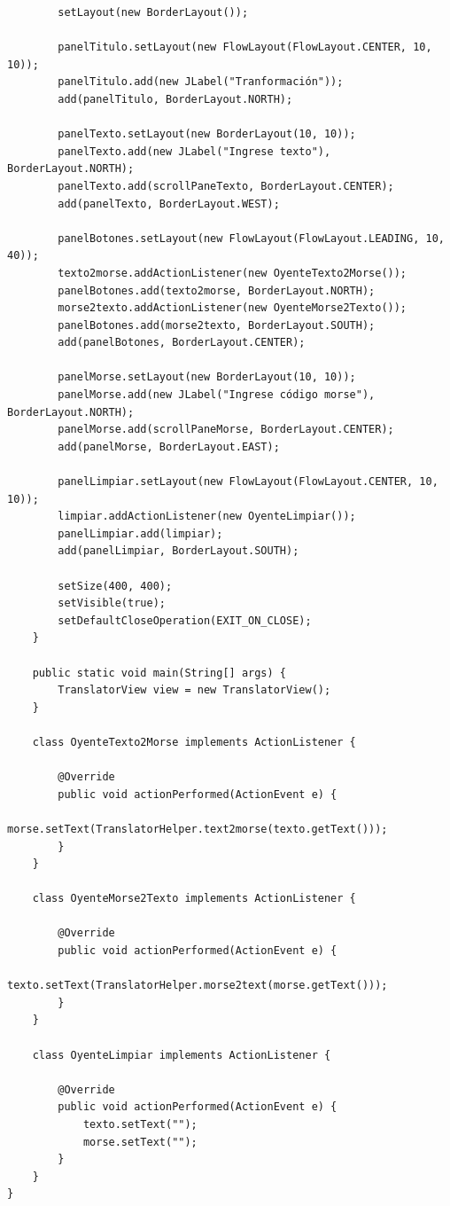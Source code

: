 \documentclass[10pt]{article}
\begin{document}
{\begin{enumerate}
\begin{verbatim}
        setLayout(new BorderLayout());
        
        panelTitulo.setLayout(new FlowLayout(FlowLayout.CENTER, 10, 10));
        panelTitulo.add(new JLabel("Tranformación"));
        add(panelTitulo, BorderLayout.NORTH);

        panelTexto.setLayout(new BorderLayout(10, 10));
        panelTexto.add(new JLabel("Ingrese texto"), BorderLayout.NORTH);
        panelTexto.add(scrollPaneTexto, BorderLayout.CENTER);
        add(panelTexto, BorderLayout.WEST);

        panelBotones.setLayout(new FlowLayout(FlowLayout.LEADING, 10, 40));
        texto2morse.addActionListener(new OyenteTexto2Morse());
        panelBotones.add(texto2morse, BorderLayout.NORTH);
        morse2texto.addActionListener(new OyenteMorse2Texto());
        panelBotones.add(morse2texto, BorderLayout.SOUTH);
        add(panelBotones, BorderLayout.CENTER);
        
        panelMorse.setLayout(new BorderLayout(10, 10));
        panelMorse.add(new JLabel("Ingrese código morse"), BorderLayout.NORTH);
        panelMorse.add(scrollPaneMorse, BorderLayout.CENTER);
        add(panelMorse, BorderLayout.EAST);

        panelLimpiar.setLayout(new FlowLayout(FlowLayout.CENTER, 10, 10));
        limpiar.addActionListener(new OyenteLimpiar());
        panelLimpiar.add(limpiar);
        add(panelLimpiar, BorderLayout.SOUTH);
          
        setSize(400, 400);
        setVisible(true);
        setDefaultCloseOperation(EXIT_ON_CLOSE);
    }
    
    public static void main(String[] args) {
        TranslatorView view = new TranslatorView();
    }
    
    class OyenteTexto2Morse implements ActionListener {

        @Override
        public void actionPerformed(ActionEvent e) {
            morse.setText(TranslatorHelper.text2morse(texto.getText()));
        }
    }
    
    class OyenteMorse2Texto implements ActionListener {

        @Override
        public void actionPerformed(ActionEvent e) {
            texto.setText(TranslatorHelper.morse2text(morse.getText()));
        }
    }
    
    class OyenteLimpiar implements ActionListener {

        @Override
        public void actionPerformed(ActionEvent e) {
            texto.setText("");
            morse.setText("");
        }
    }
}
\end{verbatim}

\end{enumerate}
}
\end{document}
